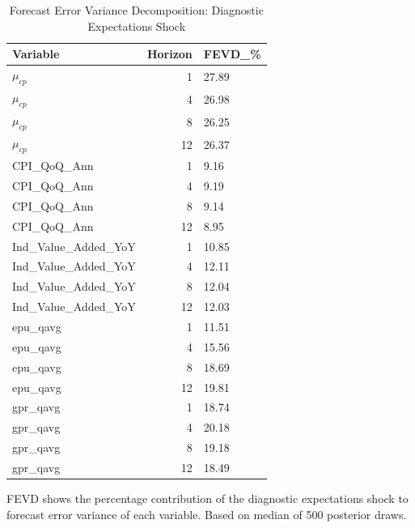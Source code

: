 \begin{table}[!htbp]
    \centering
    \caption{Forecast Error Variance Decomposition: Diagnostic Expectations Shock}
    \label{tab:bvar_fevd}
    \begin{tabular}{lrl}
        \toprule
        Variable               & Horizon & FEVD\_\% \\
        \midrule
        $\mu_{cp}$             & 1       & 27.89    \\
        $\mu_{cp}$             & 4       & 26.98    \\
        $\mu_{cp}$             & 8       & 26.25    \\
        $\mu_{cp}$             & 12      & 26.37    \\
        CPI\_QoQ\_Ann          & 1       & 9.16     \\
        CPI\_QoQ\_Ann          & 4       & 9.19     \\
        CPI\_QoQ\_Ann          & 8       & 9.14     \\
        CPI\_QoQ\_Ann          & 12      & 8.95     \\
        Ind\_Value\_Added\_YoY & 1       & 10.85    \\
        Ind\_Value\_Added\_YoY & 4       & 12.11    \\
        Ind\_Value\_Added\_YoY & 8       & 12.04    \\
        Ind\_Value\_Added\_YoY & 12      & 12.03    \\
        epu\_qavg              & 1       & 11.51    \\
        epu\_qavg              & 4       & 15.56    \\
        epu\_qavg              & 8       & 18.69    \\
        epu\_qavg              & 12      & 19.81    \\
        gpr\_qavg              & 1       & 18.74    \\
        gpr\_qavg              & 4       & 20.18    \\
        gpr\_qavg              & 8       & 19.18    \\
        gpr\_qavg              & 12      & 18.49    \\
        \bottomrule
    \end{tabular}

    \begin{tablenotes}[flushleft]
        \footnotesize
        \item FEVD shows the percentage contribution of the diagnostic expectations shock to forecast error variance of each variable. Based on median of 500 posterior draws.
    \end{tablenotes}
\end{table}